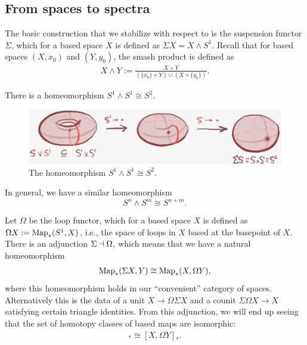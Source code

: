 \documentclass{article}[11pt]
\newcommand{\smashprod}{\wedge} %
\begin{document}
\subsection{From spaces to spectra}

The basic construction that we stabilize with respect to is the suspension functor  $\Sigma$, which  for a based space $X$ is defined as $\Sigma X = X\smashprod S^1$. Recall that for based spaces $(X,x_0)$ and $(Y,y_0)$, the smash product is defined as
\begin{align*}
	X \smashprod Y := \frac{X\times Y}{(\{x_0\}\times Y) \cup (X \times \{y_0\})}.
\end{align*}

\begin{example}\label{ex:homeomorphism-smashing-spheres} There is a homeomorphism $S^1 \smashprod S^1 \cong S^2$.

\begin{figure}[h]
  \includegraphics[width=\linewidth]{pics/s1_smash_s1.png}
  \centering
  \caption{The homeomorphism $S^1\smashprod S^1 \cong S^2$.}
  \label{fig:s1-smash-s1}
\end{figure}

In general, we have a similar homeomorphism
$$S^n \smashprod S^m \cong S^{n+m}.$$
\end{example}



Let $\Omega$ be the loop functor, which for a based space $X$ is defined as $\Omega X := \textup{Map}_\ast (S^1,X)$, i.e., the space of loops in $X$ based at the basepoint of $X$. There is an adjunction $\Sigma \dashv \Omega$, which means that we have a natural homeomorphism
\begin{align*}
	\textup{Map}_\ast (\Sigma X,Y) \cong \textup{Map}_\ast (X, \Omega Y),
\end{align*}
where this homeomorphism holds in our ``convenient'' category of spaces. Alternatively this is the data of a unit $X \to \Omega \Sigma X$ and a counit $\Sigma \Omega X \to X$ satisfying certain triangle identities. From this adjunction, we will end up seeing that the set of homotopy classes of based maps are isomorphic:
\begin{align*}
	[\Sigma X, Y]_\ast \cong [X, \Omega Y]_\ast.
\end{align*}
\end{document}
